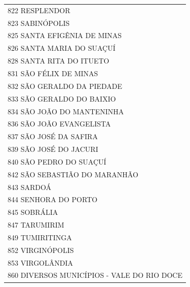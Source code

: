 \documentclass{article}
\begin{document}
\begin{longtable}[c]{m{18cm}}
\multicolumn{1}{l}{ \hspace{2em} 822 RESPLENDOR } \\
\multicolumn{1}{l}{ \hspace{2em} 823 SABINÓPOLIS } \\
\multicolumn{1}{l}{ \hspace{2em} 825 SANTA EFIGÊNIA DE MINAS } \\
\multicolumn{1}{l}{ \hspace{2em} 826 SANTA MARIA DO SUAÇUÍ } \\
\multicolumn{1}{l}{ \hspace{2em} 828 SANTA RITA DO ITUETO } \\
\multicolumn{1}{l}{ \hspace{2em} 831 SÃO FÉLIX DE MINAS } \\
\multicolumn{1}{l}{ \hspace{2em} 832 SÃO GERALDO DA PIEDADE } \\
\multicolumn{1}{l}{ \hspace{2em} 833 SÃO GERALDO DO BAIXIO } \\
\multicolumn{1}{l}{ \hspace{2em} 834 SÃO JOÃO DO MANTENINHA } \\
\multicolumn{1}{l}{ \hspace{2em} 836 SÃO JOÃO EVANGELISTA } \\
\multicolumn{1}{l}{ \hspace{2em} 837 SÃO JOSÉ DA SAFIRA } \\
\multicolumn{1}{l}{ \hspace{2em} 839 SÃO JOSÉ DO JACURI } \\
\multicolumn{1}{l}{ \hspace{2em} 840 SÃO PEDRO DO SUAÇUÍ } \\
\multicolumn{1}{l}{ \hspace{2em} 842 SÃO SEBASTIÃO DO MARANHÃO } \\
\multicolumn{1}{l}{ \hspace{2em} 843 SARDOÁ } \\
\multicolumn{1}{l}{ \hspace{2em} 844 SENHORA DO PORTO } \\
\multicolumn{1}{l}{ \hspace{2em} 845 SOBRÁLIA } \\
\multicolumn{1}{l}{ \hspace{2em} 847 TARUMIRIM } \\
\multicolumn{1}{l}{ \hspace{2em} 849 TUMIRITINGA } \\
\multicolumn{1}{l}{ \hspace{2em} 852 VIRGINÓPOLIS } \\
\multicolumn{1}{l}{ \hspace{2em} 853 VIRGOLÂNDIA } \\
\multicolumn{1}{l}{ \hspace{2em} 860 DIVERSOS MUNICÍPIOS - VALE DO RIO DOCE } \\
\end{longtable}
\end{document}
